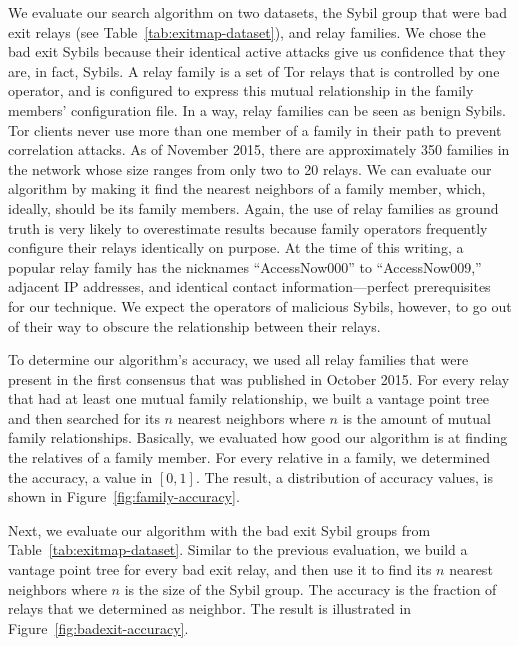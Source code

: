 We evaluate our search algorithm on two datasets, the Sybil group that were
bad exit relays (see Table~\ref{tab:exitmap-dataset}), and relay families.  We
chose the bad exit Sybils because their identical active attacks give us
confidence that they are, in fact, Sybils.  A relay family is a set of Tor
relays that is controlled by one operator, and is configured to express this
mutual relationship in the family members' configuration file.  In a way, relay
families can be seen as benign Sybils.  Tor clients never use more than one
member of a family in their path to prevent correlation attacks.  As of November
2015, there are approximately 350 families in the network whose size ranges from
only two to 20 relays.  We can evaluate our algorithm by making it find the
nearest neighbors of a family member, which, ideally, should be its family
members.  Again, the use of relay families as ground truth is very likely to
overestimate results because family operators frequently configure their relays
identically on purpose.  At the time of this writing, a popular relay family has
the nicknames ``AccessNow000'' to ``AccessNow009,'' adjacent IP addresses, and
identical contact information---perfect prerequisites for our technique.  We
expect the operators of malicious Sybils, however, to go out of their way to
obscure the relationship between their relays.

To determine our algorithm's accuracy, we used all relay families that were
present in the first consensus that was published in October 2015.  For every
relay that had at least one mutual family relationship, we built a vantage point
tree and then searched for its $n$ nearest neighbors where $n$ is the amount of
mutual family relationships.  Basically, we evaluated how good our algorithm is
at finding the relatives of a family member.  For every relative in a family, we
determined the accuracy, a value in $[0,1]$.  The result, a distribution of
accuracy values, is shown in Figure~\ref{fig:family-accuracy}.

Next, we evaluate our algorithm with the bad exit Sybil groups from
Table~\ref{tab:exitmap-dataset}.  Similar to the previous evaluation, we build a
vantage point tree for every bad exit relay, and then use it to find its $n$
nearest neighbors where $n$ is the size of the Sybil group.  The accuracy is the
fraction of relays that we determined as neighbor.  The result is illustrated
in Figure~\ref{fig:badexit-accuracy}.

